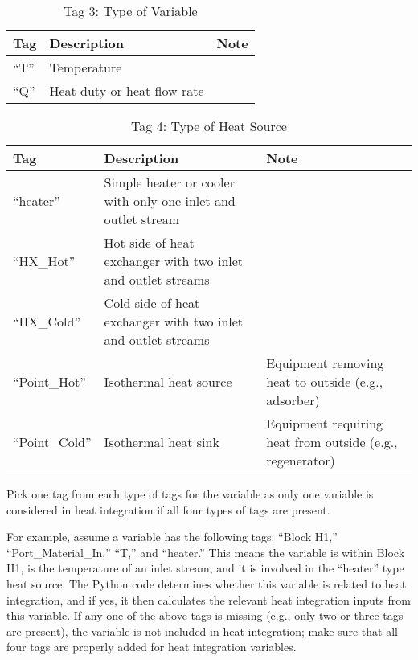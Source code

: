 \begin{table}[H]
	\begin{center}
		\caption{Tag 3: Type of Variable}
		\label{tag.3}
		\begin{tabular}{l p{6cm} p{6cm}}
			\toprule
			\textbf{Tag}	& \textbf{Description} 			& \textbf{Note} 	\\
			\midrule
			``T'' 			& Temperature 					& 		\\	
			``Q''			& Heat duty or heat flow rate 	& 		\\	
			\bottomrule
		\end{tabular}
	\end{center}
\end{table}

\begin{table}[H]
	\begin{center}
		\caption{Tag 4: Type of Heat Source}
		\label{tag.4}
		\begin{tabular}{l p{6cm} p{6cm}}
			\toprule
			\textbf{Tag}	& \textbf{Description} 			& \textbf{Note} 	\\
			\midrule
			``heater''		& Simple heater or cooler with only one inlet and outlet stream		& 	\\
			``HX\_Hot''		& Hot side of heat exchanger with two inlet and outlet streams		& 	\\
			``HX\_Cold''	& Cold side of heat exchanger with two inlet and outlet streams 	& 	\\	
			``Point\_Hot''	& Isothermal heat source 	& Equipment removing heat to outside (e.g., adsorber) 	\\
			``Point\_Cold''	& Isothermal heat sink		& Equipment requiring heat from outside (e.g., regenerator) \\ 
			\bottomrule
		\end{tabular}
	\end{center}
\end{table}	

Pick one tag from each type of tags for the variable as only one variable is considered in heat integration if all four types of tags are present. 

For example, assume a variable has the following tags: ``Block H1,'' \\ ``Port\_Material\_In,'' ``T,'' and ``heater.'' This means the variable is within Block H1, is the temperature of an inlet stream, and it is involved in the ``heater'' type heat source. The Python code determines whether this variable is related to heat integration, and if yes, it then calculates the relevant heat integration inputs from this variable. If any one of the above tags is missing (e.g., only two or three tags are present), the variable is not included in heat integration; make sure that all four tags are properly added for heat integration variables.

